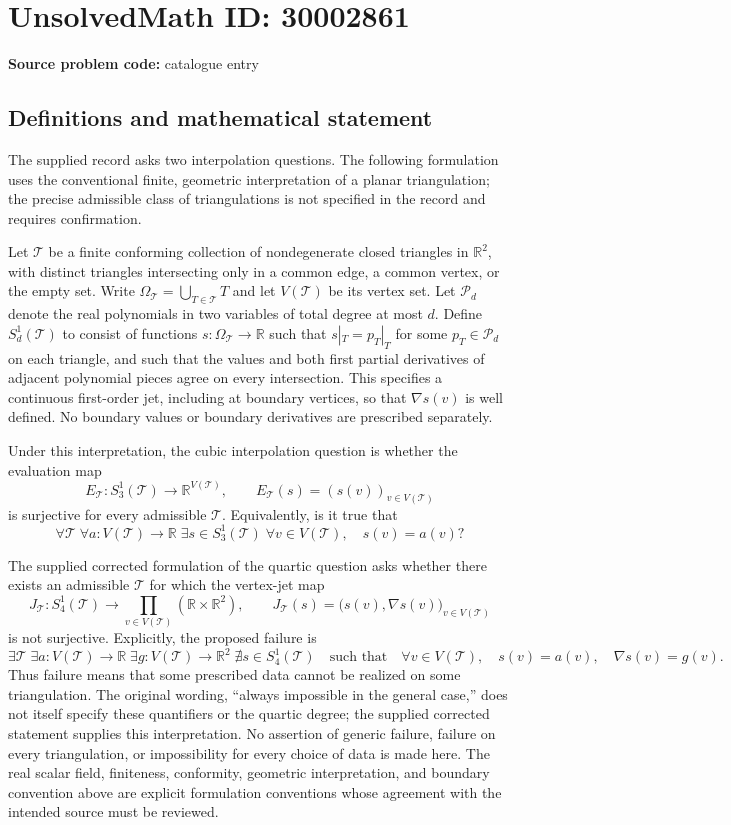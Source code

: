 \documentclass[11pt]{article}
\newcommand{\R}{\mathbb{R}}
\begin{document}
\section*{UnsolvedMath ID: 30002861}
\textbf{Source problem code:} catalogue entry
\subsection{Definitions and mathematical statement}
The supplied record asks two interpolation questions. The following formulation uses the conventional finite, geometric interpretation of a planar triangulation; the precise admissible class of triangulations is not specified in the record and requires confirmation.

Let \(\mathcal T\) be a finite conforming collection of nondegenerate closed triangles in \(\R^2\), with distinct triangles intersecting only in a common edge, a common vertex, or the empty set. Write \(\Omega_{\mathcal T}=\bigcup_{T\in\mathcal T}T\) and let \(V(\mathcal T)\) be its vertex set. Let \(\mathcal P_d\) denote the real polynomials in two variables of total degree at most \(d\). Define \(S_d^1(\mathcal T)\) to consist of functions \(s:\Omega_{\mathcal T}\to\R\) such that \(s|_T=p_T|_T\) for some \(p_T\in\mathcal P_d\) on each triangle, and such that the values and both first partial derivatives of adjacent polynomial pieces agree on every intersection. This specifies a continuous first-order jet, including at boundary vertices, so that \(\nabla s(v)\) is well defined. No boundary values or boundary derivatives are prescribed separately.

Under this interpretation, the cubic interpolation question is whether the evaluation map
\[
E_{\mathcal T}:S_3^1(\mathcal T)\longrightarrow\R^{V(\mathcal T)},\qquad
E_{\mathcal T}(s)=(s(v))_{v\in V(\mathcal T)}
\]
is surjective for every admissible \(\mathcal T\). Equivalently, is it true that
\[
\forall\mathcal T\;\forall a:V(\mathcal T)\to\R\;\exists s\in S_3^1(\mathcal T)\;\forall v\in V(\mathcal T),\quad s(v)=a(v)?
\]

The supplied corrected formulation of the quartic question asks whether there exists an admissible \(\mathcal T\) for which the vertex-jet map
\[
J_{\mathcal T}:S_4^1(\mathcal T)\longrightarrow
\prod_{v\in V(\mathcal T)}(\R\times\R^2),\qquad
J_{\mathcal T}(s)=\bigl(s(v),\nabla s(v)\bigr)_{v\in V(\mathcal T)}
\]
is not surjective. Explicitly, the proposed failure is
\[
\exists\mathcal T\;\exists a:V(\mathcal T)\to\R\;\exists g:V(\mathcal T)\to\R^2\;\nexists s\in S_4^1(\mathcal T)
\quad\text{such that}\quad
\forall v\in V(\mathcal T),\quad s(v)=a(v),\quad\nabla s(v)=g(v).
\]
Thus failure means that some prescribed data cannot be realized on some triangulation. The original wording, ``always impossible in the general case,'' does not itself specify these quantifiers or the quartic degree; the supplied corrected statement supplies this interpretation. No assertion of generic failure, failure on every triangulation, or impossibility for every choice of data is made here. The real scalar field, finiteness, conformity, geometric interpretation, and boundary convention above are explicit formulation conventions whose agreement with the intended source must be reviewed.
\end{document}

